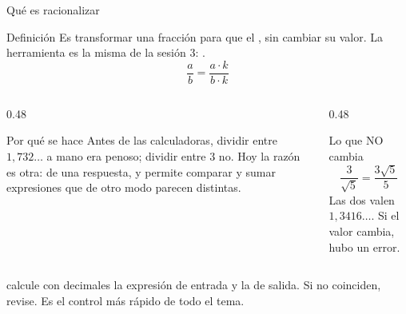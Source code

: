 \documentclass[aspectratio=169,10pt]{beamer}
\begin{document}
\begin{frame}{Qué es racionalizar}
  \scriptsize
  \begin{block}{Definición}
    \tiny
    Es transformar una fracción para que el , sin cambiar su valor. La herramienta es la misma de la sesión
    3: .
    \[ \frac{a}{b} = \frac{a\cdot k}{b\cdot k} \]
  \end{block}

  \vspace{0.1cm}
  \begin{columns}[T,onlytextwidth]
    \begin{column}{0.48\textwidth}
      \begin{exampleblock}{Por qué se hace}
        \tiny
        Antes de las calculadoras, dividir entre $1{,}732\dots$ a mano era
        penoso; dividir entre $3$ no. Hoy la razón es otra:
         de una
        respuesta, y permite comparar y sumar expresiones que de otro modo
        parecen distintas.
      \end{exampleblock}
    \end{column}
    \begin{column}{0.48\textwidth}
      \begin{alertblock}{Lo que NO cambia}
        \tiny
        \[ \frac{3}{\sqrt{5}} = \frac{3\sqrt{5}}{5} \]
        Las dos valen $1{,}3416\dots$.  Si el valor cambia, hubo un error.
      \end{alertblock}
    \end{column}
  \end{columns}

  \vspace{0.08cm}
  {\tiny\color{uniGris}  calcule con
  decimales la expresión de entrada y la de salida. Si no coinciden, revise.
  Es el control más rápido de todo el tema.}
\end{frame}
\end{document}
